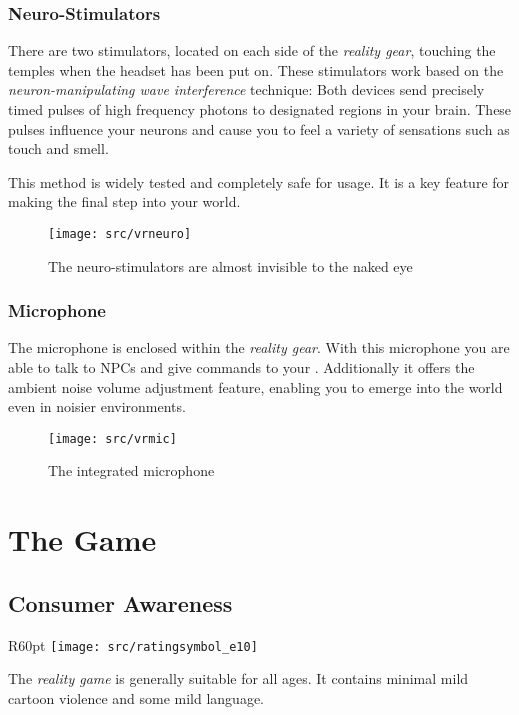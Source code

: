 \subsection{Neuro-Stimulators}
There are two stimulators, located on each side of the \emph{\poke{} reality gear}, touching the temples when the headset has been put on. These stimulators work based on the \emph{neuron-manipulating wave interference} technique: Both devices send precisely timed pulses of high frequency photons to designated regions in your brain. These pulses influence your neurons and cause you to feel a variety of sensations such as touch and smell. 

This method is widely tested and completely safe for usage. It is a key feature for making the final step into your \poke{} world.

\begin{figure}[!ht]
\begin{center}
\texttt{[image: src/vrneuro]}
\end{center}
\caption[The neuro-stimulators are almost invisible to the naked eye]{The neuro-stimulators are almost invisible to the naked eye}
\label{vrneuro}
\end{figure}

\subsection{Microphone}
The microphone is enclosed within the \emph{\poke{} reality gear}. With this microphone you are able to talk to NPCs and give commands to your \poke{}. Additionally it offers the ambient noise volume adjustment feature, enabling you to emerge into the \poke{} world even in noisier environments.

\begin{figure}[!ht]
\begin{center}
\texttt{[image: src/vrmic]}
\end{center}
\caption[The integrated microphone]{The integrated microphone}
\label{vrmic}
\end{figure}

\chapter{The Game}
\label{software}

\section{Consumer Awareness}
\begin{wrapfigure}{R}{60pt}
\vspace{-18pt}
\texttt{[image: src/ratingsymbol\_e10]}
\vspace{-30pt}
\end{wrapfigure}
The \emph{\poke{} reality game} is generally suitable for all ages. It contains minimal mild cartoon violence and some mild language.

